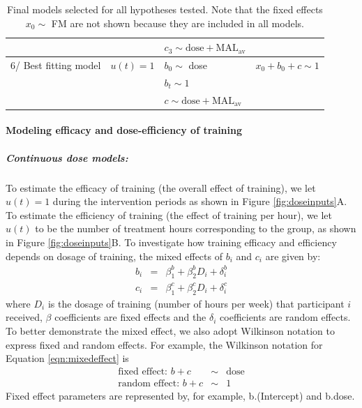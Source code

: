 \begin{table}[b]
\begin{tabular}{|l|l|l|l|l|}
		\multicolumn{2}{|l|}{} && $ c_3 \sim \text{dose} + \text{MAL}_\text{av} $ & \\ 
		\hline
		\multicolumn{2}{|l|}{6/ Best fitting model} & $ u(t)=1 $ & $ b_0 \sim $ dose & $ x_0 + b_0 + c \sim 1 $\\	
		\multicolumn{2}{|l|}{} && $ b_t \sim 1 $ & \\ 
		\multicolumn{2}{|l|}{} && $ c \sim \text{dose} + \text{MAL}_\text{av} $ & \\ 
		\hline
	\end{tabular}
	\caption[Final models selected for all hypotheses tested.]{Final models selected for all hypotheses tested. Note that the fixed effects $ x_0 \sim $ FM are not shown because they are included in all models.}
	\label{tab:models}
\end{table}


\paragraph{Modeling efficacy and dose-efficiency of training}
\subparagraph{Continuous dose models: } 
To estimate the efficacy of training (the overall effect of training), we let $ u(t)=1 $ during the intervention periods as shown in Figure \ref{fig:doseinputs}A. 
To estimate the efficiency of training (the effect of training per hour), we let $ u(t) $ to be the number of treatment hours corresponding to the group, as shown in Figure  \ref{fig:doseinputs}B.  
To investigate how training efficacy and efficiency depends on dosage of training, the mixed effects of $ b_i $ and $ c_i $ are given by:
\begin{eqnarray}\label{eqn:mixedeffect}
	b_i &=& \beta_1^b + \beta_2^b D_i + \delta_i^b   \nonumber \\
	c_i &=& \beta_1^c + \beta_2^c D_i + \delta_i^c   
\end{eqnarray}
where $ D_i $ is the dosage of training (number of hours per week) that participant $ i $ received, 
$ \beta $ coefficients are fixed effects and the $ \delta_i $ coefficients are random effects. 
To better demonstrate the mixed effect, we also adopt Wilkinson notation to express fixed and random effects. 
For example, the Wilkinson notation for Equation \ref{eqn:mixedeffect} is
\begin{eqnarray}
	\text{fixed effect: } b + c  &\sim& \text{dose} \\
	\text{random effect: } b + c &\sim& 1
\end{eqnarray}
Fixed effect parameters are represented by, for example, b.(Intercept) and b.dose.


